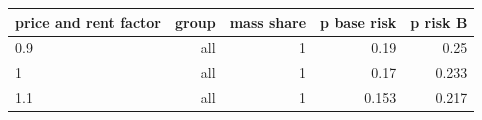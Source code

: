 \begin{tabular}{lrrrr}
\toprule
price and rent factor & group & mass share & p base risk & p risk B \\
\midrule
0.9 & all & 1 & 0.19 & 0.25 \\
1 & all & 1 & 0.17 & 0.233 \\
1.1 & all & 1 & 0.153 & 0.217 \\
\bottomrule
\end{tabular}
